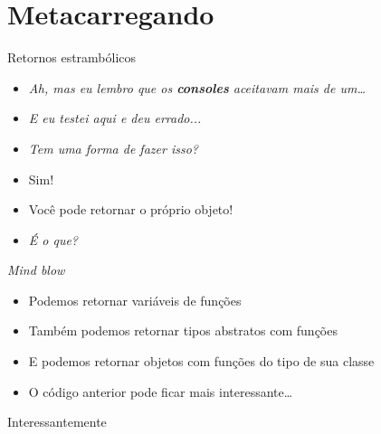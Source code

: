 \documentclass[14pt]{beamer}
\begin{document}
	\section{Metacarregando}
		\begin{frame}{Retornos estrambólicos}
			\begin{itemize}
				\presentationPause\item \textit{Ah, mas eu lembro que os \textbf{consoles} aceitavam mais de um\dots}
				\presentationPause\item \textit{E eu testei aqui e deu errado...}
				\presentationPause\item \textit{Tem uma forma de fazer isso?}
				\presentationPause\item Sim!
				\presentationPause\item Você pode retornar o próprio objeto!
				\presentationPause\item \textit{É o que?}
			\end{itemize}
		\end{frame}

		\begin{frame}{\textit{Mind blow}}
			\begin{itemize}
				\presentationPause\item Podemos retornar variáveis de funções
				\presentationPause\item Também podemos retornar tipos abstratos com funções
				\presentationPause\item E podemos retornar objetos com funções do tipo de sua classe
				\presentationPause\item O código anterior pode ficar mais interessante\dots
			\end{itemize}
		\end{frame}
		
		\begin{frame}{Interessantemente}
			\presentationPause
			\begin{columns}
				\begin{column}{.5\textwidth}
					
				\end{column}
				\begin{column}{.4\textwidth}
					
				\end{column}
			\end{columns}
		\end{frame}
\end{document}
